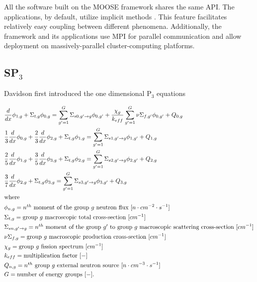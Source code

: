 \documentclass[letterpaper]{article}
\begin{document}
All the software built on the MOOSE framework shares the same \gls{API}.
The applications, by default, utilize implicit methods \cite{lindsay_introduction_2018}.
This feature facilitates relatively easy coupling between different phenomena.
Additionally, the framework and its applications use \gls{MPI} for parallel communication and allow deployment on massively-parallel cluster-computing platforms.

\subsection{SP$_3$}
\label{sec:sp3}

Davidson \cite{davidson_neutron_1957} first introduced the one dimensional P$_3$ equations

\begin{align}
    & \frac{d}{dx} \phi_{1,g} + \Sigma_{t,g} \phi_{0,g} = \sum_{g'=1}^G \Sigma_{s0,g' \rightarrow g} \phi_{0,g'} + \frac{\chi_g}{k_{eff}} \sum_{g'=1}^G \nu\Sigma_{f,g'} \phi_{0,g'} + Q_{0,g}  \label{eq:SP3-0} \\
    & \frac{1}{3} \frac{d}{dx} \phi_{0,g} + \frac{2}{3}\frac{d}{dx}\phi_{2,g} + \Sigma_{t,g} \phi_{1,g} = \sum_{g'=1}^G \Sigma_{s1,g' \rightarrow g} \phi_{1,g'} + Q_{1,g} \label{eq:SP3-1} \\
    & \frac{2}{5} \frac{d}{dx}\phi_{1,g} + \frac{3}{5}\frac{d}{dx}\phi_{3,g} + \Sigma_{t,g} \phi_{2,g} = \sum_{g'=1}^G \Sigma_{s2,g' \rightarrow g} \phi_{2,g'} + Q_{2,g} \label{eq:SP3-2} \\
    & \frac{3}{7}\frac{d}{dx}\phi_{2,g} + \Sigma_{t,g} \phi_{3,g} = \sum_{g'=1}^G \Sigma_{s3,g' \rightarrow g} \phi_{3,g'} + Q_{3,g} \label{eq:P3-3} \\
    \intertext{where}
    & \phi_{n,g} = \mbox{$n^{th}$ moment of the group $g$ neutron flux } [n \cdot cm^{-2} \cdot s^{-1}]  \notag \\
    & \Sigma_{t,g} = \mbox{group $g$ macroscopic total cross-section } [cm^{-1}]  \notag \\
	& \Sigma_{sn,g' \rightarrow g} = \mbox{$n^{th}$ moment of the group $g'$ to group $g$ macroscopic scattering cross-section } [cm^{-1}]  \notag \\
	& \nu\Sigma_{f,g} = \mbox{group $g$ macroscopic production cross-section } [cm^{-1}]  \notag \\
	& \chi_{g} = \mbox{group $g$ fission spectrum } [cm^{-1}]  \notag \\
	& k_{eff} = \mbox{multiplication factor } [-]  \notag \\
	& Q_{n,g} = \mbox{$n^{th}$ group $g$ external neutron source } [n \cdot cm^{-3} \cdot s^{-1}]  \notag \\
	& G = \mbox{number of energy groups } [-].  \notag
\end{align}
\end{document}
